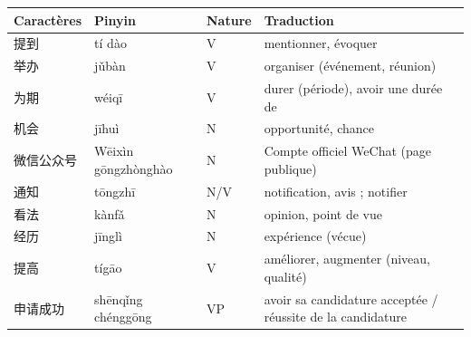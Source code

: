 \documentclass[11pt]{article}
\begin{document}
\begin{definition}
\begin{center}
\begin{tabularx}{\linewidth}{|X|X|X|X|}
\hline
\rowcolor{popblueL} \textbf{Caractères} & \textbf{Pinyin} & \textbf{Nature} & \textbf{Traduction} \\
\hline
提到 & tí dào & V & mentionner, évoquer \\
\hline
举办 & jǔbàn & V & organiser (événement, réunion) \\
\hline
为期 & wéiqī & V & durer (période), avoir une durée de \\
\hline
机会 & jīhuì & N & opportunité, chance \\
\hline
微信公众号 & Wēixìn gōngzhònghào & N & Compte officiel WeChat (page publique) \\
\hline
通知 & tōngzhī & N/V & notification, avis ; notifier \\
\hline
看法 & kànfǎ & N & opinion, point de vue \\
\hline
经历 & jīnglì & N & expérience (vécue) \\
\hline
提高 & tígāo & V & améliorer, augmenter (niveau, qualité) \\
\hline
申请成功 & shēnqǐng chénggōng & VP & avoir sa candidature acceptée / réussite de la candidature \\
\hline
\end{tabularx}
\end{center}
\end{definition}
\end{document}
